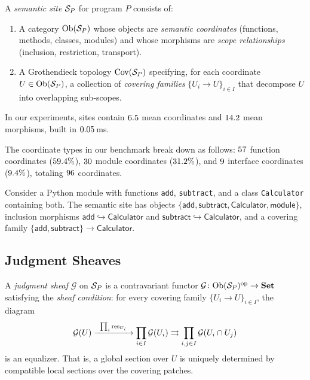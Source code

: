 \documentclass[11pt]{article}
\newcommand{\op}{\mathrm{op}}                       %
\newcommand{\Set}{\mathbf{Set}}                     %
\begin{document}
\begin{definition}\label{def:semantic-site}
A \emph{semantic site} $\mathcal{S}_P$ for program $P$ consists of:
\begin{enumerate}[noitemsep]
  \item A category $\mathrm{Ob}(\mathcal{S}_P)$ whose objects are \emph{semantic
        coordinates} (functions, methods, classes, modules) and whose
        morphisms are \emph{scope relationships} (inclusion, restriction,
        transport).
  \item A Grothendieck topology $\mathrm{Cov}(\mathcal{S}_P)$ specifying, for each
        coordinate $U \in \mathrm{Ob}(\mathcal{S}_P)$, a collection of
        \emph{covering families} $\{U_i \to U\}_{i \in I}$ that
        decompose $U$ into overlapping sub-scopes.
\end{enumerate}
In our experiments, sites contain $6.5$ mean coordinates
and $14.2$ mean morphisms, built in
$0.05$\,ms.
\end{definition}

The coordinate types in our benchmark break down as follows:
$57$ function coordinates
($59.4\%$), $30$ module coordinates
($31.2\%$), and $9$ interface
coordinates ($9.4\%$), totaling
$96$ coordinates.

\begin{example}\label{ex:calculator-site}
Consider a Python module with functions \texttt{add}, \texttt{subtract},
and a class \texttt{Calculator} containing both.  The semantic site has
objects $\{\mathsf{add}, \mathsf{subtract}, \mathsf{Calculator},
\mathsf{module}\}$, inclusion morphisms
$\mathsf{add} \hookrightarrow \mathsf{Calculator}$ and
$\mathsf{subtract} \hookrightarrow \mathsf{Calculator}$,
and a covering family
$\{\mathsf{add}, \mathsf{subtract}\} \to \mathsf{Calculator}$.
\end{example}

\subsection{Judgment Sheaves}\label{ssec:judgment-sheaves}

\begin{definition}\label{def:judgment-sheaf}
A \emph{judgment sheaf} $\mathcal{G}$ on $\mathcal{S}_P$ is a contravariant
functor $\mathcal{G} \colon \Ob(\Site_P)^{\op} \to \Set$ satisfying
the \emph{sheaf condition}: for every covering family
$\{U_i \to U\}_{i \in I}$, the diagram
\[
  \mathcal{G}(U) \xrightarrow{\;\;\prod_i \mathrm{res}_{U_i}\;\;}
  \prod_{i \in I} \mathcal{G}(U_i)
  \rightrightarrows
  \prod_{i,j \in I} \mathcal{G}(U_i \cap U_j)
\]
is an equalizer.  That is, a global section over $U$ is uniquely
determined by compatible local sections over the covering patches.
\end{definition}
\end{document}

